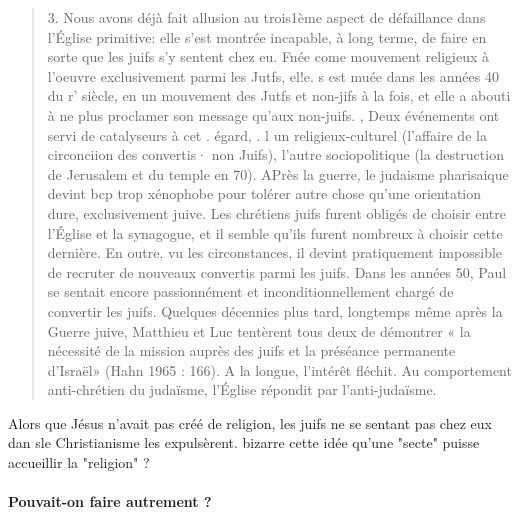 \begin{quote}
3. Nous avons déjà fait allusion au trois1ème aspect de défaillance
dans l'Église primitive: elle s'est montrée incapable, à long terme, de
faire en sorte que les juifs s'y sentent chez eu. Fnée come
mouvement religieux à l'oeuvre exclusivement parmi les Jutfs, el!e. s est
muée dans les années 40 du r' siècle, en un mouvement des Jutfs et
non-jifs à la fois, et elle a abouti à ne plus proclamer son message
qu'aux non-juifs. ,
Deux événements ont servi de catalyseurs à cet . égard, . l un
religieux-culturel (l'affaire de la circonciion des convertis· non Juifs),
l'autre sociopolitique (la destruction de Jerusalem et du temple en 70). APrès la guerre, le judaisme pharisaique devint bcp trop  
    xénophobe pour tolérer autre chose qu'une orientation dure,
exclusivement juive. Les chrétiens juifs furent obligés de choisir entre
l'Église et la synagogue, et il semble qu'ils furent nombreux à choisir
cette dernière. En outre, vu les circonstances, il devint pratiquement
impossible de recruter de nouveaux convertis parmi les juifs.
Dans les années 50, Paul se sentait encore passionnément et
inconditionnellement chargé de convertir les juifs. Quelques décennies
plus tard, longtemps même après la Guerre juive, Matthieu et Luc
tentèrent tous deux de démontrer « la nécessité de la mission auprès
des juifs et la préséance permanente d'Israël» (Hahn 1965 : 166). A
la longue, l'intérêt fléchit. Au comportement anti-chrétien du
judaïsme, l'Église répondit par l'anti-judaïsme.
\end{quote}

Alors que Jésus n'avait pas créé de religion, les juifs ne se sentant pas chez eux dan sle Christianisme les expulsèrent.
bizarre cette idée qu'une "secte" puisse accueillir la "religion" ? 


\paragraph{Pouvait-on faire autrement ?}

